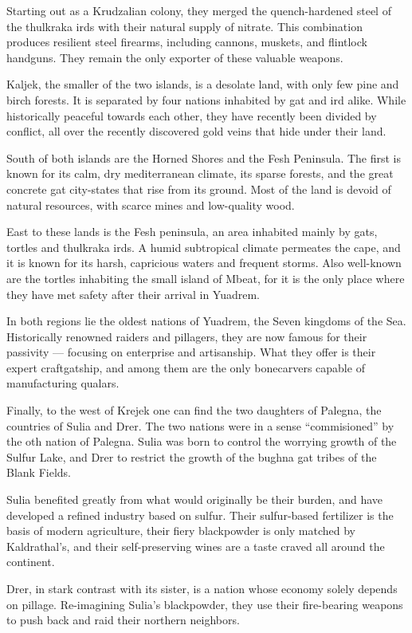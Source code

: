 Starting out as a Krudzalian colony, they merged the quench-hardened steel of the thulkraka irds with their natural supply of nitrate.
This combination produces resilient steel firearms, including cannons, muskets, and flintlock handguns.
They remain the only exporter of these valuable weapons.

Kaljek, the smaller of the two islands, is a desolate land, with only few pine and birch forests.
It is separated by four nations inhabited by gat and ird alike.
While historically peaceful towards each other, they have recently been divided by conflict, all over the recently discovered gold veins that hide under their land.

South of both islands are the Horned Shores and the Fesh Peninsula.
The first is known for its calm, dry mediterranean climate, its sparse forests, and the great concrete gat city-states that rise from its ground.
Most of the land is devoid of natural resources, with scarce mines and low-quality wood.

East to these lands is the Fesh peninsula, an area inhabited mainly by gats, tortles and thulkraka irds.
A humid subtropical climate permeates the cape, and it is known for its harsh, capricious waters and frequent storms.
Also well-known are the tortles inhabiting the small island of Mbeat, for it is the only place where they have met safety after their arrival in Yuadrem.

In both regions lie the oldest nations of Yuadrem, the Seven kingdoms of the Sea.
Historically renowned raiders and pillagers, they are now famous for their passivity --- focusing on enterprise and artisanship.
What they offer is their expert craftgatship, and among them are the only bonecarvers capable of manufacturing qualars.

Finally, to the west of Krejek one can find the two daughters of Palegna, the countries of Sulia and Drer.
The two nations were in a sense ``commisioned'' by the oth nation of Palegna.
Sulia was born to control the worrying growth of the Sulfur Lake, and Drer to restrict the growth of the bughna gat tribes of the Blank Fields.

Sulia benefited greatly from what would originally be their burden, and have developed a refined industry based on sulfur.
Their sulfur-based fertilizer is the basis of modern agriculture, their fiery blackpowder is only matched by Kaldrathal's, and their self-preserving wines are a taste craved all around the continent.

Drer, in stark contrast with its sister, is a nation whose economy solely depends on pillage.
Re-imagining Sulia's blackpowder, they use their fire-bearing weapons to push back and raid their northern neighbors.
